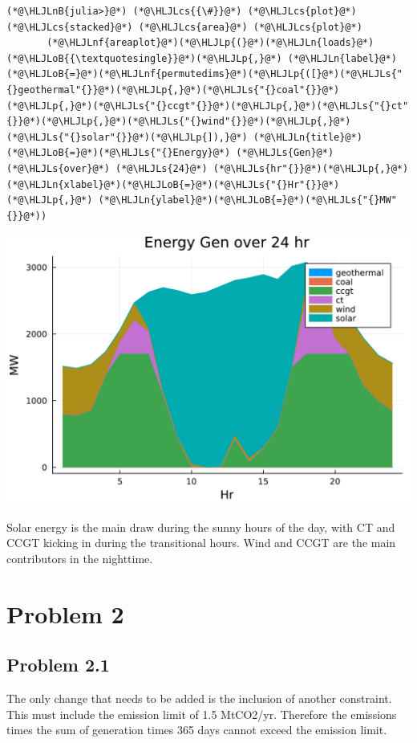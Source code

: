 \documentclass[12pt,a4paper]{article}
\newcommand{\HLJLn}[1]{#1}
\newcommand{\HLJLnf}[1]{\textcolor[RGB]{66,102,213}{#1}}
\newcommand{\HLJLs}[1]{\textcolor[RGB]{201,61,57}{#1}}
\newcommand{\HLJLnB}[1]{\textcolor[RGB]{59,151,46}{#1}}
\newcommand{\HLJLoB}[1]{\textcolor[RGB]{102,102,102}{\textbf{#1}}}
\newcommand{\HLJLp}[1]{#1}
\newcommand{\HLJLcs}[1]{\textcolor[RGB]{153,153,119}{\textit{#1}}}
\begin{document}
\begin{lstlisting}
(*@\HLJLnB{julia>}@*) (*@\HLJLcs{{\#}}@*) (*@\HLJLcs{plot}@*) (*@\HLJLcs{stacked}@*) (*@\HLJLcs{area}@*) (*@\HLJLcs{plot}@*)
       (*@\HLJLnf{areaplot}@*)(*@\HLJLp{(}@*)(*@\HLJLn{loads}@*)(*@\HLJLoB{{\textquotesingle}}@*)(*@\HLJLp{,}@*) (*@\HLJLn{label}@*)(*@\HLJLoB{=}@*)(*@\HLJLnf{permutedims}@*)(*@\HLJLp{([}@*)(*@\HLJLs{"{}geothermal"{}}@*)(*@\HLJLp{,}@*)(*@\HLJLs{"{}coal"{}}@*)(*@\HLJLp{,}@*)(*@\HLJLs{"{}ccgt"{}}@*)(*@\HLJLp{,}@*)(*@\HLJLs{"{}ct"{}}@*)(*@\HLJLp{,}@*)(*@\HLJLs{"{}wind"{}}@*)(*@\HLJLp{,}@*)(*@\HLJLs{"{}solar"{}}@*)(*@\HLJLp{]),}@*) (*@\HLJLn{title}@*)(*@\HLJLoB{=}@*)(*@\HLJLs{"{}Energy}@*) (*@\HLJLs{Gen}@*) (*@\HLJLs{over}@*) (*@\HLJLs{24}@*) (*@\HLJLs{hr"{}}@*)(*@\HLJLp{,}@*) (*@\HLJLn{xlabel}@*)(*@\HLJLoB{=}@*)(*@\HLJLs{"{}Hr"{}}@*)(*@\HLJLp{,}@*) (*@\HLJLn{ylabel}@*)(*@\HLJLoB{=}@*)(*@\HLJLs{"{}MW"{}}@*))
\end{lstlisting}
\includegraphics[width=\linewidth]{figures/solution-template_6_2.pdf}

Solar energy is the main draw during the sunny hours of the day, with CT and CCGT kicking in during the transitional hours.  Wind and CCGT are the main contributors in the nighttime.

\section{Problem 2}
\subsection{Problem 2.1}
The only change that needs to be added is the inclusion of another constraint. This must include the emission limit  of 1.5 MtCO2/yr. Therefore the emissions times the sum of generation times 365 days cannot exceed the emission limit.
\end{document}
